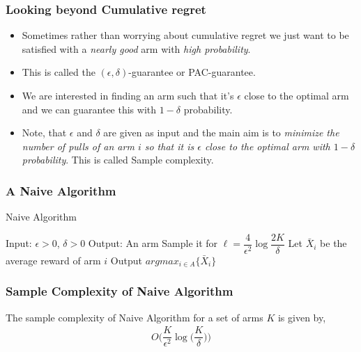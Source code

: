 \begin{frame}
\frametitle{Looking beyond Cumulative regret}
\begin{itemize}
\item<1-> Sometimes rather than worrying about cumulative regret we just want to be satisfied with a \emph{nearly good} arm with \emph{high probability}.
\item<2-> This is called the $(\epsilon,\delta)$-guarantee or PAC-guarantee. 
\item<3-> We are interested in finding an arm such that it's $\epsilon$ close to the optimal arm and we can guarantee this with $1-\delta$ probability.
\item<4-> Note, that $\epsilon$ and $\delta$ are given as input and the main aim is to \emph{minimize the number of pulls of an arm $i$ so that it is $\epsilon$ close to the optimal arm with $1-\delta$ probability}. This is called Sample complexity. 
\end{itemize}
\end{frame}

\begin{frame}
\frametitle{A Naive Algorithm}
\begin{algorithm}[H]
\caption{Naive Algorithm}
\begin{algorithmic}[1]
\State Input: $\epsilon > 0$, $\delta > 0$
\State Output: An arm  
\State Sample it for $\ell=\dfrac{4}{\epsilon^{2}}\log \dfrac{2K}{\delta}$
\State Let $\bar{X}_i$ be the average reward of arm $i$
\EndFor
\State Output $argmax_{i\in A}\lbrace \bar{X}_i \rbrace$
\end{algorithmic}
\end{algorithm}
\cite{even2006action}
\end{frame}

\begin{frame}
\frametitle{Sample Complexity of Naive Algorithm}
\begin{theorem}
The sample complexity of Naive Algorithm for a set of arms $K$ is given by,
\begin{align*}
O\bigg( \dfrac{K}{\epsilon^2}\log \big( \dfrac{K}{\delta} \big) \bigg)
\end{align*}
\end{theorem}
\cite{even2006action}
\end{frame}

